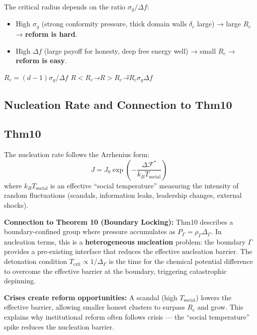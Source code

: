 \documentclass[12pt,a4paper]{article}
\theoremstyle{plain}
\theoremstyle{definition}
\newcommand{\cF}{\mathcal{F}}
\newcommand{\deltac}{\delta_c}        %
\newcommand{\Rc}{R_c}                 %
\newcommand{\cn}[1]{\textcolor{scxgray}{\textit{#1}}}
\begin{document}
The critical radius depends on the ratio $\sigma_g/\Delta f$:
\begin{itemize}
    \item High $\sigma_g$ (strong conformity pressure, thick domain walls $\deltac$ large)
          → large $\Rc$ → \textbf{reform is hard}.
    \item High $\Delta f$ (large payoff for honesty, deep free energy well)
          → small $\Rc$ → \textbf{reform is easy}.
\end{itemize}

\bigskip
\noindent
\cn{$\Rc = (d-1)\sigma_g/\Delta f$ $R<\Rc$→$R>\Rc$→\"\"$\Rc$$\sigma_g$$\Delta f$}

\subsection{Nucleation Rate and Connection to Thm10}
\subsection*{Thm10}

The nucleation rate follows the Arrhenius form:
\begin{equation}
    J = J_0 \exp\left(-\frac{\Delta \cF^*}{k_B T_{\text{social}}}\right)
    \label{eq:nucleation_rate}
\end{equation}
where $k_B T_{\text{social}}$ is an effective ``social temperature'' measuring
the intensity of random fluctuations (scandals, information leaks, leadership
changes, external shocks).

\textbf{Connection to Theorem 10 (Boundary Locking):} Thm10 describes a
boundary-confined group where pressure accumulates as $P_\Gamma = \rho_\Gamma \Delta_\Gamma$.
In nucleation terms, this is a \textbf{heterogeneous nucleation} problem:
the boundary $\Gamma$ provides a pre-existing interface that reduces the
effective nucleation barrier. The detonation condition $T_{\text{crit}} \propto 1/\Delta_\Gamma$
is the time for the chemical potential difference to overcome the effective
barrier at the boundary, triggering catastrophic depinning.

\textbf{Crises create reform opportunities:} A scandal (high $T_{\text{social}}$)
lowers the effective barrier, allowing smaller honest clusters to surpass $\Rc$
and grow. This explains why institutional reform often follows crisis — the
``social temperature'' spike reduces the nucleation barrier.
\end{document}

